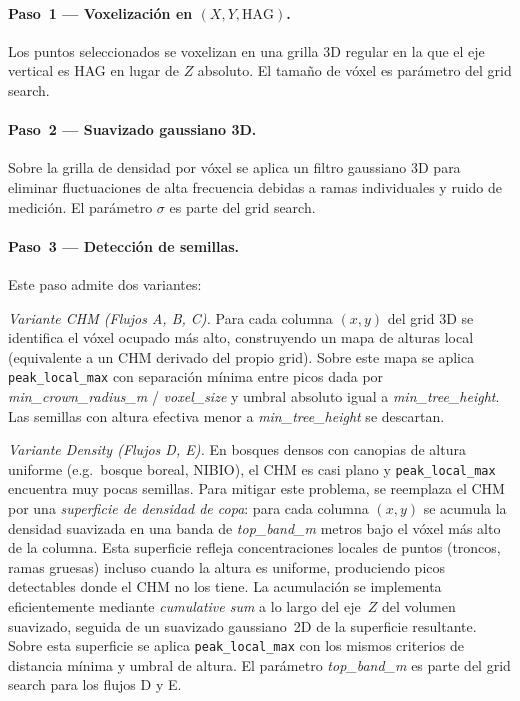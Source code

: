 \documentclass[runningheads]{llncs}
\begin{document}
\paragraph{Paso~1 --- Voxelizaci\'on en $(X, Y, \text{HAG})$.} Los puntos seleccionados se voxelizan en una grilla 3D regular en la que el eje vertical es HAG en lugar de $Z$ absoluto. El tama\~no de v\'oxel es par\'ametro del grid search.

\paragraph{Paso~2 --- Suavizado gaussiano 3D.} Sobre la grilla de densidad por v\'oxel se aplica un filtro gaussiano 3D para eliminar fluctuaciones de alta frecuencia debidas a ramas individuales y ruido de medici\'on. El par\'ametro $\sigma$ es parte del grid search.

\paragraph{Paso~3 --- Detecci\'on de semillas.} Este paso admite dos variantes:

\emph{Variante CHM (Flujos A, B, C).} Para cada columna $(x, y)$ del grid 3D se identifica el v\'oxel ocupado m\'as alto, construyendo un mapa de alturas local (equivalente a un CHM derivado del propio grid). Sobre este mapa se aplica \texttt{peak\_local\_max} con separaci\'on m\'inima entre picos dada por \emph{min\_crown\_radius\_m} / \emph{voxel\_size} y umbral absoluto igual a \emph{min\_tree\_height}. Las semillas con altura efectiva menor a \emph{min\_tree\_height} se descartan.

\emph{Variante Density (Flujos D, E).} En bosques densos con canopias de altura uniforme (e.g.\ bosque boreal, NIBIO), el CHM es casi plano y \texttt{peak\_local\_max} encuentra muy pocas semillas. Para mitigar este problema, se reemplaza el CHM por una \emph{superficie de densidad de copa}: para cada columna $(x, y)$ se acumula la densidad suavizada en una banda de \emph{top\_band\_m} metros bajo el v\'oxel m\'as alto de la columna. Esta superficie refleja concentraciones locales de puntos (troncos, ramas gruesas) incluso cuando la altura es uniforme, produciendo picos detectables donde el CHM no los tiene. La acumulaci\'on se implementa eficientemente mediante \emph{cumulative sum} a lo largo del eje~$Z$ del volumen suavizado, seguida de un suavizado gaussiano~2D de la superficie resultante. Sobre esta superficie se aplica \texttt{peak\_local\_max} con los mismos criterios de distancia m\'inima y umbral de altura. El par\'ametro \emph{top\_band\_m} es parte del grid search para los flujos D y E.
\end{document}
